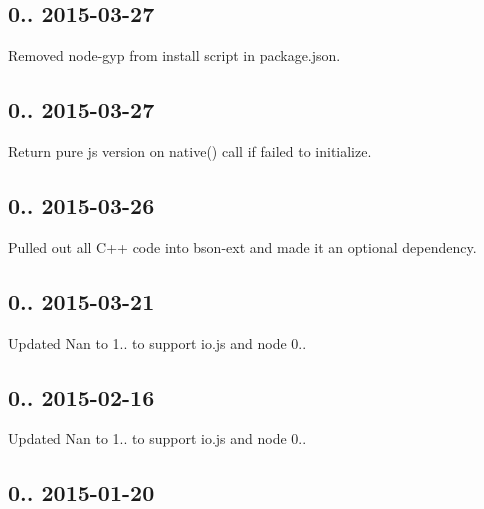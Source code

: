 \subsection*{0.. 2015-\/03-\/27 }


\begin{DoxyItemize}
\item Removed node-\/gyp from install script in package.\+json.
\end{DoxyItemize}

\subsection*{0.. 2015-\/03-\/27 }


\begin{DoxyItemize}
\item Return pure js version on native() call if failed to initialize.
\end{DoxyItemize}

\subsection*{0.. 2015-\/03-\/26 }


\begin{DoxyItemize}
\item Pulled out all C++ code into bson-\/ext and made it an optional dependency.
\end{DoxyItemize}

\subsection*{0.. 2015-\/03-\/21 }


\begin{DoxyItemize}
\item Updated Nan to 1.. to support io.\+js and node 0..
\end{DoxyItemize}

\subsection*{0.. 2015-\/02-\/16 }


\begin{DoxyItemize}
\item Updated Nan to 1.. to support io.\+js and node 0..
\end{DoxyItemize}

\subsection*{0.. 2015-\/01-\/20 }


